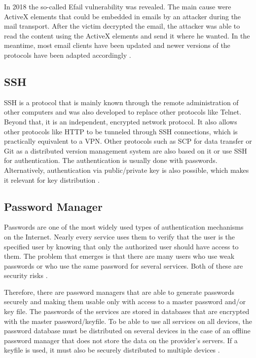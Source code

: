 \documentclass[12pt,oneside,a4paper,parskip]{scrbook}
\begin{document}
In 2018 the so-called Efail vulnerability was revealed. The main cause were ActiveX elements that could be embedded in emails by an attacker during the mail transport. After the victim decrypted the email, the attacker was able to read the content using the ActiveX elements and send it where he wanted. In the meantime, most email clients have been updated and newer versions of the protocols have been adapted accordingly \parencite{bsi_bsi_nodate}.

\subsection{SSH}
SSH is a protocol that is mainly known through the remote administration of other computers and was also developed to replace other protocols like Telnet.  Beyond that, it is an independent, encrypted network protocol. It also allows other protocols like HTTP to be tunneled through SSH connections, which is practically equivalent to a VPN. Other protocols such as SCP for data transfer or Git as a distributed version management system are also based on it or use SSH for authentication. The authentication is usually done with passwords. Alternatively, authentication via public/private key is also possible, which makes it relevant for key distribution \parencite{luber_ssh_2020}.


\subsection{Password Manager}
Passwords are one of the most widely used types of authentication mechanisms on the Internet. Nearly every service uses them to verify that the user is the specified user by knowing that only the authorized user should have access to them. The problem that emerges is that there are many users who use weak passwords or who use the same password for several services. Both of these are security risks \parencite{verizon_2019}.

Therefore, there are password managers that are able to generate passwords securely and making them usable only with access to a master password and/or key file. The passwords of the services are stored in databases that are encrypted with the master password/keyfile. To be able to use all services on all devices, the password database must be distributed on several devices in the case of an offline password manager that does not store the data on the provider's servers. If a keyfile is used, it must also be securely distributed to multiple devices \parencite{reichl_composite_nodate}.
\end{document}
